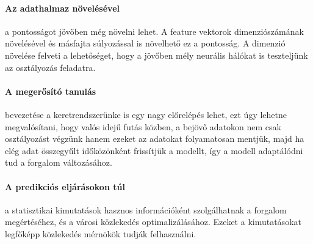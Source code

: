 \documentclass[12pt,a4paper]{article}
\begin{document}
\paragraph{Az adathalmaz növelésével} a pontosságot jövőben még növelni lehet. A feature vektorok dimenziószámának növelésével és másfajta súlyozással is növelhető ez a pontosság. A dimenzió növelése felveti a lehetőséget, hogy a jövőben mély neurális hálókat is teszteljünk az osztályozás feladatra.
\paragraph{A megerősító tanulás} bevezetése a keretrendszerünke is egy nagy előrelépés lehet, ezt úgy lehetne megvalósítani, hogy valós idejű futás közben, a bejövő adatokon nem csak osztályozást végzünk hanem ezeket az adatokat folyamatosan mentjük, majd ha elég adat összegyűlt időközönként frissítjük a modellt, így a modell adaptálódni tud a forgalom változásához.
\paragraph{A predikciós eljárásokon túl} a statisztikai kimutatások hasznos információként szolgálhatnak a forgalom megértéséhez, és a városi közlekedés optimalizálásához. Ezeket a kimutatásokat legfőképp közlekedés mérnökök tudják felhasználni.

\newpage
\printbibliography
\end{document}
